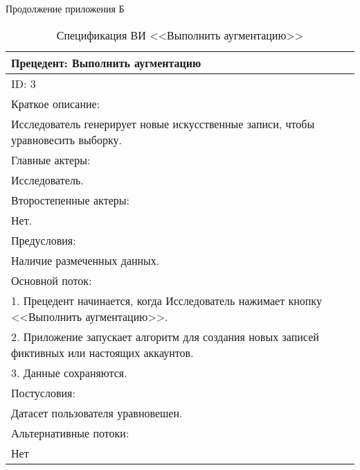\newpage
\begin{flushright}
Продолжение приложения Б 
\end{flushright}
\vspace{-1.5em}
\begin{table}[H]
    \caption{Спецификация ВИ <<Выполнить аугментацию>>}
    \vspace{1em}
    \begin{tabular}{|p{\textwidth}|}
       \hline
        Прецедент: Выполнить аугментацию\\ \hline
        ID: 3\\ \hline
        Краткое описание: \\ Исследователь генерирует новые искусственные записи, чтобы уравновесить выборку.\\ \hline
        Главные актеры: \\ Исследователь.\\ \hline
        Второстепенные актеры: \\ Нет. \\ \hline
        Предусловия: \\ Наличие размеченных данных.\\ \hline
        Основной поток: \\ 
        1. Прецедент начинается, когда Исследователь нажимает кнопку <<Выполнить аугментацию>>.\\
        2. Приложение запускает алгоритм для создания новых записей фиктивных или настоящих аккаунтов. \\
        3. Данные сохраняются. \\  \hline
        Постусловия: \\ Датасет пользователя уравновешен. \\ \hline
        Альтернативные потоки: \\ Нет \\ \hline
        \end{tabular} 
    \label{tab:Augmentation}
\end{table}
\vspace{2em}



